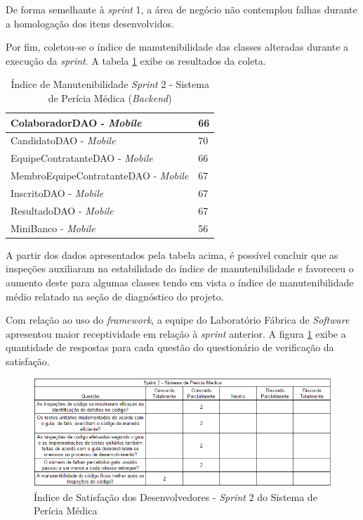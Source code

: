 De forma semelhante à \textit{sprint} 1, a área de negócio não contemplou falhas durante a homologação dos itens desenvolvidos.

Por fim, coletou-se o índice de manutenibilidade das classes alteradas durante a execução da \textit{sprint}. A tabela \ref{table:tabela17} exibe os resultados da coleta.

\begin{table}[h]
\caption{Índice de Manutenibilidade \textit{Sprint} 2 - Sistema de Perícia Médica (\textit{Backend})}
\centering
\begin{tabular}{ | m{12cm} | m{4cm} | } 
\hline
ColaboradorDAO - \textit{Mobile} & 66 \\ 
\hline
CandidatoDAO - \textit{Mobile} & 70 \\
\hline
EquipeContratanteDAO - \textit{Mobile} & 66 \\
\hline
MembroEquipeContratanteDAO - \textit{Mobile} & 67 \\
\hline
InscritoDAO - \textit{Mobile} & 67 \\
\hline
ResultadoDAO - \textit{Mobile} & 67 \\
\hline
MiniBanco - \textit{Mobile} & 56 \\
\hline
\end{tabular}
\label{table:tabela17}
\end{table}

\clearpage

A partir dos dados apresentados pela tabela acima, é possível concluir que as inspeções auxiliaram na estabilidade do índice de manutenibilidade e favoreceu o aumento deste para algumas classes tendo em vista o índice de manutenibilidade médio relatado na seção de diagnóstico do projeto.

Com relação ao uso do \textit{framework}, a equipe do Laboratório Fábrica de \textit{Software} apresentou maior receptividade em relação à \textit{sprint} anterior. A figura \ref{fig:satisfacaoPericia2} exibe a quantidade de respostas para cada questão do questionário de verificação da satisfação.

\begin{figure}[h]
\includegraphics[width=\textwidth]{figuras/isd_pericia_2.png}
\caption{Índice de Satisfação dos Desenvolvedores - \textit{Sprint} 2 do Sistema de Perícia Médica}
\label{fig:satisfacaoPericia2}
\end{figure}